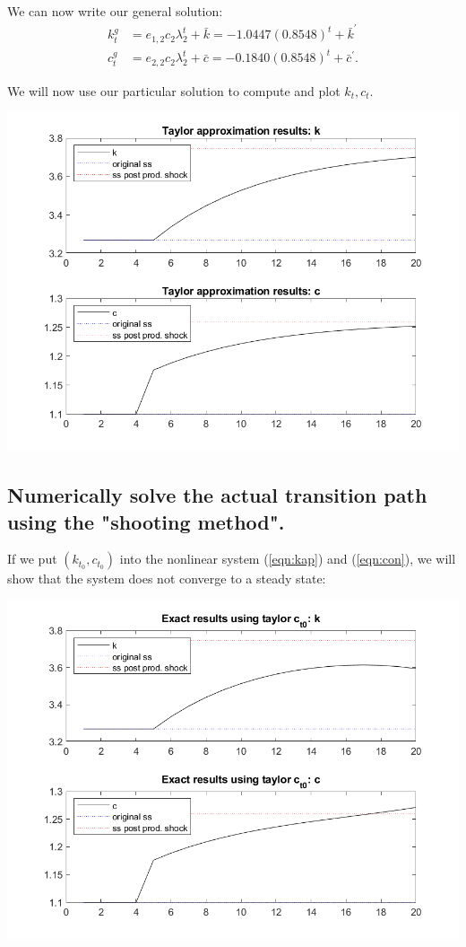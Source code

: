 \documentclass[11pt]{article} %
\begin{document}
We can now write our general solution:
\begin{align*}
k_{t}^{g} &= e_{1,2} c_2 \lambda_{2}^{t} + \bar{k}  = -1.0447 (0.8548)^t + \bar{k}^{'}\\
c_{t}^{g} &= e_{2,2} c_2 \lambda_{2}^{t} + \bar{c}  = -0.1840 (0.8548)^t + \bar{c}^{'}.
\end{align*}

We will now use our particular solution to compute and plot $k_t,c_t$.

\includegraphics{taylor}

\subsection{Numerically solve the actual transition path using the "shooting method".}

If we put $(k_{t_0},c_{t_0})$ into the nonlinear system  (\ref{eqn:kap}) and (\ref{eqn:con}), we will show that the system does not converge to a steady state:

\includegraphics{exact}
\end{document}

